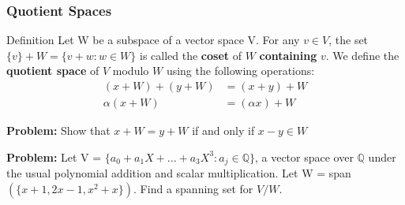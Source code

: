 \documentclass[11pt]{beamer}
\begin{document}
\begin{frame}
	\frametitle{Quotient Spaces}
	\begin{block}{Definition}
		Let W be a subspace of a vector space V. For any $v \in V$, the set $\{v\} + W = \{v + w: w \in W\}$ is called the \textbf{coset} of $W$ \textbf{containing} $v$. We define the \textbf{quotient space} of $V$ modulo $W$ using the following operations:
		\begin{align*}
			(x + W) + (y + W) &= (x + y) + W \\
			\alpha (x + W) &= (\alpha x) + W
		\end{align*}
	\end{block}
	
	\phantom{}
	
	\textbf{Problem:} Show that $x + W = y + W$ if and only if $x-y \in W$
	
	\phantom{}

	\textbf{Problem: } Let V = $\{a_{0} + a_{1}X + ... + a_{3}X^{3} : a_{j} \in \mathbb{Q}\}$, a vector space over $\mathbb{Q}$ under the usual polynomial addition and scalar multiplication. Let W = span$( \{x+1, 2x-1, x^{2}+x\})$. Find a spanning set for $V/W$.
\end{frame}
\end{document}
